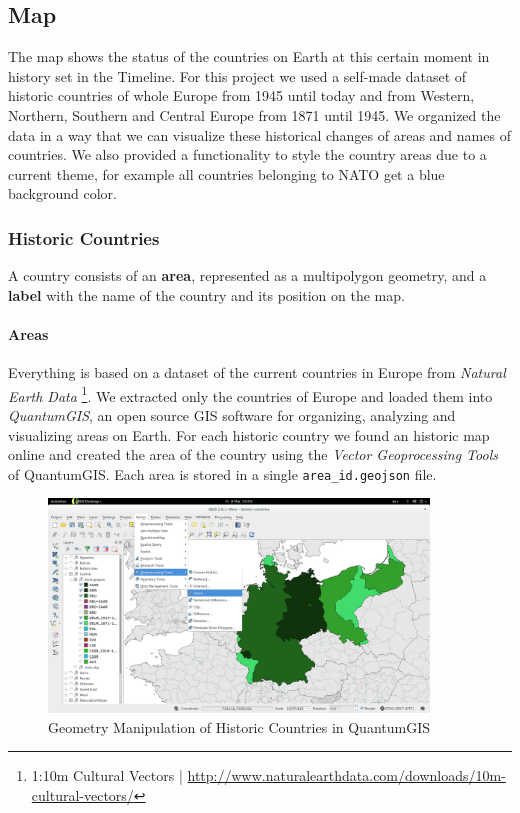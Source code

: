 \subsection{Map} %
\label{sub:map}

The map shows the status of the countries on Earth at this certain moment in history set in the Timeline. For this project we used a self-made dataset of historic countries of whole Europe from 1945 until today and from Western, Northern, Southern and Central Europe from 1871 until 1945. We organized the data in a way that we can visualize these historical changes of areas and names of countries. We also provided a functionality to style the country areas due to a current theme, for example all countries belonging to NATO get a blue background color.

\subsubsection{Historic Countries} %
\label{ssub:historic_countries}

A country consists of an \textbf{area}, represented as a multipolygon geometry, and a \textbf{label} with the name of the country and its position on the map.

\newpage
\paragraph{Areas}
Everything is based on a dataset of the current countries in Europe from \textit{Natural Earth Data}
\footnote{1:10m Cultural Vectors | \url{http://www.naturalearthdata.com/downloads/10m-cultural-vectors/}}.
We extracted only the countries of Europe and loaded them into \textit{QuantumGIS}, an open source GIS software for organizing, analyzing and visualizing areas on Earth. For each historic country we found an historic map online and created the area of the country using the \textit{Vector Geoprocessing Tools} of QuantumGIS. Each area is stored in a single \texttt{area\_id.geojson} file.

\begin{figure}[H]
  \begin{center}
    \includegraphics[width=0.9\textwidth]{graphics/qgis.png}
  \end{center}
  \caption{Geometry Manipulation of Historic Countries in QuantumGIS}
  \label{fig:qgis}
\end{figure}
\label{par:area}

